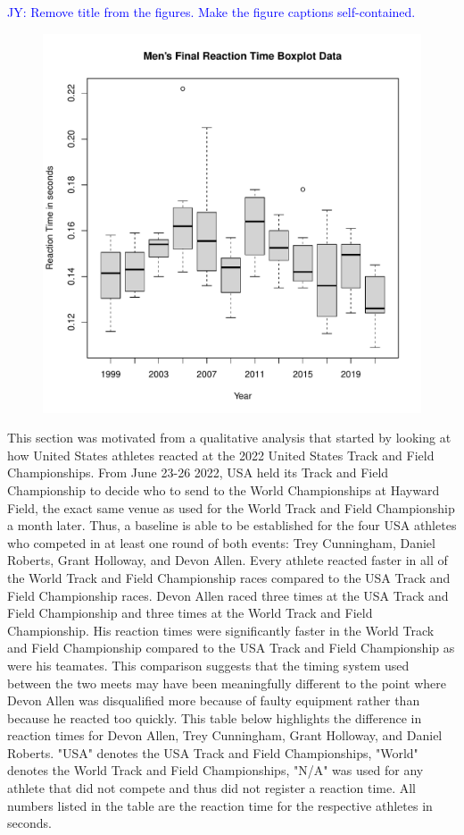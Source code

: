 \documentclass[12pt, letterpaper, titlepage]{article}
\newcommand{\jy}[1]{\textcolor{blue}{JY: #1}}
\begin{document}
\jy{Remove title from the figures. Make the figure captions self-contained.}
\begin{figure}[h]
  \centering 
  \includegraphics{BoxplotFinals}
  \label{fig:BoxplotFinals}
\end{figure}

This section was motivated from a qualitative analysis that started by looking
at how United States athletes reacted at the 2022 United States Track and Field
Championships. From June 23-26 2022, USA held its Track
and Field Championship to decide who to send to the World Championships at Hayward 
Field, the exact same venue as used for the World Track and Field Championship a month 
later.  Thus, a baseline is able to be established for the four USA athletes who 
competed in at least one round of both events: Trey Cunningham, Daniel Roberts, 
Grant Holloway, and Devon Allen. Every athlete reacted faster in all of the World 
Track and Field Championship races compared to the USA Track and Field 
Championship races. Devon Allen raced three times at the USA Track and
Field Championship and three times at the World Track and Field  Championship. 
His reaction times were significantly faster in the World Track and
Field Championship compared to the USA Track and Field Championship as were his
teamates.  This comparison suggests that the timing system used between the two
meets may have been meaningfully different to the point where Devon Allen was
disqualified more because of faulty equipment rather than because he reacted
too quickly.  This table below highlights the difference in reaction times for
Devon Allen, Trey Cunningham, Grant Holloway, and Daniel Roberts. "USA" denotes
the USA Track and Field Championships, "World" denotes the World Track and Field
Championships, "N/A" was used for any athlete that did not compete and thus
did not register a reaction time.  All numbers listed in the table are the reaction
time for the respective athletes in seconds. 
\end{document}
